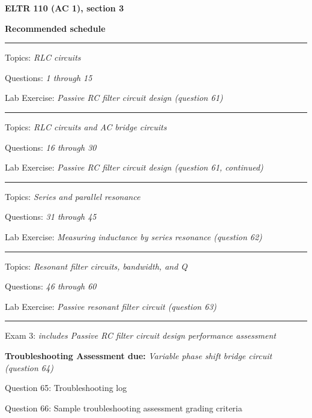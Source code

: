 
\centerline{\bf ELTR 110 (AC 1), section 3} \bigskip 
 
\vskip 10pt

\noindent
{\bf Recommended schedule}

\vskip 5pt

\hrule \vskip 5pt
\noindent
{}

\hskip 10pt Topics: {\it RLC circuits}
 
\hskip 10pt Questions: {\it 1 through 15}
 
\hskip 10pt Lab Exercise: {\it Passive RC filter circuit design (question 61)}
 
\vskip 10pt
\hrule \vskip 5pt
\noindent
{}

\hskip 10pt Topics: {\it RLC circuits and AC bridge circuits}
 
\hskip 10pt Questions: {\it 16 through 30}
 
\hskip 10pt Lab Exercise: {\it Passive RC filter circuit design (question 61, continued)}
 
\vskip 10pt
\hrule \vskip 5pt
\noindent
{}

\hskip 10pt Topics: {\it Series and parallel resonance}
 
\hskip 10pt Questions: {\it 31 through 45}
 
\hskip 10pt Lab Exercise: {\it Measuring inductance by series resonance (question 62)}
 
\vskip 10pt
\hrule \vskip 5pt
\noindent
{}

\hskip 10pt Topics: {\it Resonant filter circuits, bandwidth, and Q}
 
\hskip 10pt Questions: {\it 46 through 60}
 
\hskip 10pt Lab Exercise: {\it Passive resonant filter circuit (question 63)}
 

\vskip 10pt
\hrule \vskip 5pt
\noindent
{}

\hskip 10pt Exam 3: {\it includes Passive RC filter circuit design performance assessment}
 
\hskip 10pt {\bf Troubleshooting Assessment due:} {\it Variable phase shift bridge circuit (question 64)}
 
\hskip 10pt Question 65: Troubleshooting log
 
\hskip 10pt Question 66: Sample troubleshooting assessment grading criteria
 
